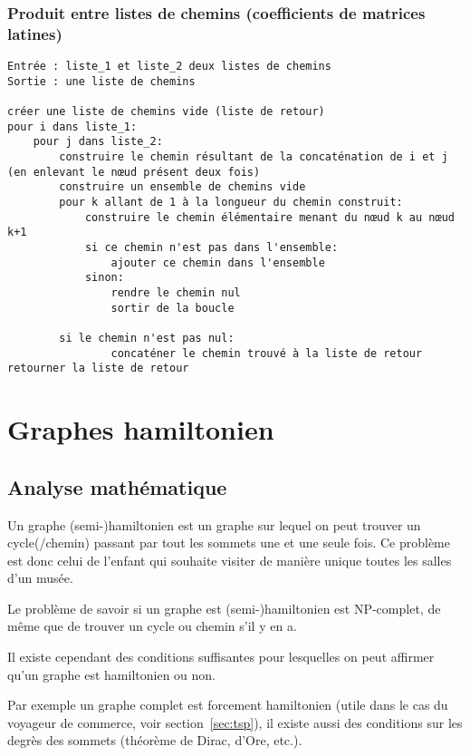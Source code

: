 \documentclass{scrartcl}
\begin{document}
    \subsubsection{Produit entre listes de chemins (coefficients de matrices
    latines)}
      \begin{lstlisting}
Entrée : liste_1 et liste_2 deux listes de chemins
Sortie : une liste de chemins

créer une liste de chemins vide (liste de retour)
pour i dans liste_1:
    pour j dans liste_2:
        construire le chemin résultant de la concaténation de i et j (en enlevant le nœud présent deux fois)
        construire un ensemble de chemins vide
        pour k allant de 1 à la longueur du chemin construit:
            construire le chemin élémentaire menant du nœud k au nœud k+1
            si ce chemin n'est pas dans l'ensemble:
                ajouter ce chemin dans l'ensemble
            sinon:
                rendre le chemin nul
                sortir de la boucle

        si le chemin n'est pas nul:
                concaténer le chemin trouvé à la liste de retour
retourner la liste de retour
			\end{lstlisting}



\section{Graphes hamiltonien}
  \subsection{Analyse mathématique}
    Un graphe (semi-)hamiltonien est un graphe sur lequel on peut
    trouver un cycle(/chemin) passant par tout les sommets une et une seule
    fois. Ce problème est donc celui de l'enfant qui souhaite visiter de
    manière unique toutes les salles d'un musée.

    Le problème de savoir si un graphe est (semi-)hamiltonien est NP-complet,
    de même que de trouver un cycle ou chemin s'il y en a.

    Il existe cependant des conditions suffisantes pour lesquelles on peut
    affirmer qu'un graphe est hamiltonien ou non.

    Par exemple un graphe complet est forcement hamiltonien (utile dans le cas
    du voyageur de commerce, voir section~\ref{sec:tsp}), il existe aussi des
    conditions sur les degrès des sommets (théorème de Dirac, d'Ore, etc.).
\end{document}
